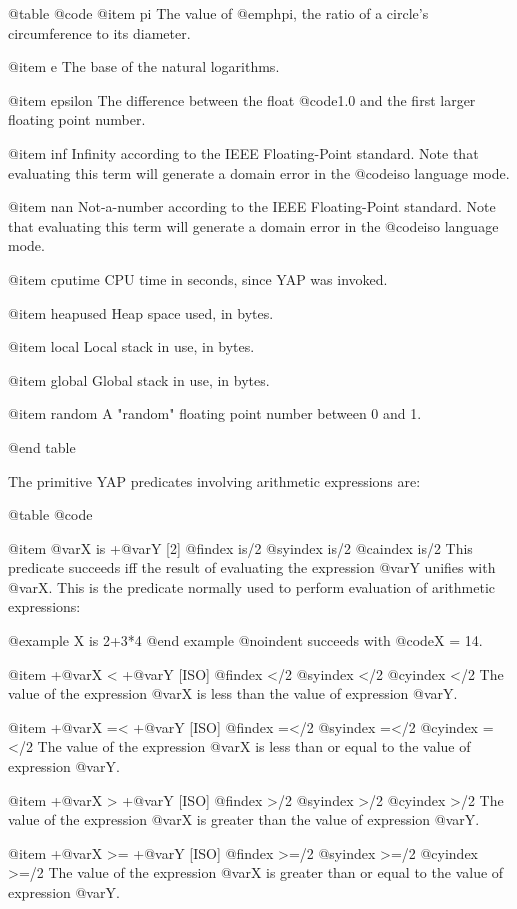 {{{{@table @code
@item pi
The value of @emph{pi}, the ratio of a circle's circumference to its
diameter.

@item e
The base of the natural logarithms.

@item epsilon
The difference between the float @code{1.0} and the first larger floating point
number.

@item inf
Infinity according to the IEEE Floating-Point standard. Note that
evaluating this term will generate a domain error in the @code{iso}
language mode.

@item nan
Not-a-number according to the IEEE Floating-Point standard. Note that
evaluating this term will generate a domain error in the @code{iso}
language mode.

@item cputime
CPU time in seconds, since YAP was invoked.

@item heapused
Heap space used, in bytes.

@item local
Local stack in use, in bytes.

@item global
Global stack in use, in bytes.

@item random
A "random" floating point number between 0 and 1.

@end table

The primitive YAP predicates involving arithmetic expressions are:

@table @code

@item @var{X} is +@var{Y} [2]
@findex is/2
@syindex is/2
@caindex is/2
This predicate succeeds iff the result of evaluating the expression
@var{Y} unifies with @var{X}. This is the predicate normally used to
perform evaluation of arithmetic expressions:

@example
X is 2+3*4
@end example
@noindent
succeeds with @code{X = 14}.

@item +@var{X} < +@var{Y} [ISO]
@findex </2
@syindex </2
@cyindex </2
The value of the expression @var{X} is less than the value of expression
@var{Y}.

@item +@var{X} =< +@var{Y} [ISO]
@findex =</2
@syindex =</2
@cyindex =</2
The value of the expression @var{X} is less than or equal to the value
of expression @var{Y}.


@item +@var{X} > +@var{Y} [ISO]
@findex >/2
@syindex >/2
@cyindex >/2
The value of the expression @var{X} is greater than the value of
expression @var{Y}.

@item +@var{X} >= +@var{Y} [ISO]
@findex >=/2
@syindex >=/2
@cyindex >=/2
The value of the expression @var{X} is greater than or equal to the
value of expression @var{Y}.

}}}}
